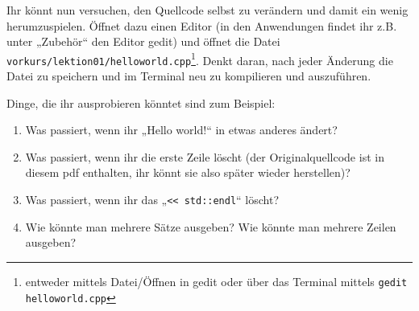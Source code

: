 \begin{spiel}

    Ihr könnt nun versuchen, den Quellcode selbst zu verändern und damit ein wenig
    herumzuspielen. Öffnet dazu einen Editor (in den Anwendungen findet ihr z.B.
    unter „Zubehör“ den Editor gedit) und öffnet die Datei
    \texttt{vorkurs/lektion01/helloworld.cpp}\footnote{entweder mittels
        \glqq{}Datei/Öffnen\grqq{} in gedit oder über das Terminal mittels \texttt{gedit
            helloworld.cpp}}. Denkt daran, nach jeder Änderung die Datei zu speichern und
    im Terminal neu zu kompilieren und auszuführen.

    Dinge, die ihr ausprobieren könntet sind zum Beispiel:
    \begin{enumerate}
        \item Was passiert, wenn ihr „Hello world!“ in etwas anderes ändert?
        \item Was passiert, wenn ihr die erste Zeile löscht (der Originalquellcode
              ist in diesem pdf enthalten, ihr könnt sie also später wieder
              herstellen)?
        \item Was passiert, wenn ihr das „\verb|<< std::endl|“ löscht?
        \item Wie könnte man mehrere Sätze ausgeben? Wie könnte man mehrere Zeilen
              ausgeben?
    \end{enumerate}
\end{spiel}